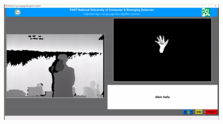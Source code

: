 \begin{figure}[!htb]
	\begin{center}
		\includegraphics[height=8.5cm,width=12cm]{ThesisFigs/userinterface2}
	
	\end{center}
\end{figure}

